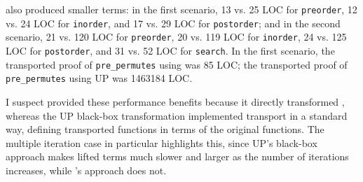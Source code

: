 \toolnamec also produced smaller terms:
in the first scenario, 13 vs. 25 LOC for \lstinline{preorder},
12 vs. 24 LOC for \lstinline{inorder}, and 17 vs. 29 LOC for \lstinline{postorder};
and in the second scenario, 21 vs. 120 LOC for \lstinline{preorder}, 20 vs. 119 LOC for \lstinline{inorder}, 
24 vs. 125 LOC for \lstinline{postorder}, and 31 vs. 52 LOC for \lstinline{search}.
In the first scenario, the transported proof of \lstinline{pre_permutes} using \toolnamec was 85 LOC;
the transported proof of \lstinline{pre_permutes} using UP was 1463184 LOC.

I suspect \toolnamec provided these performance benefits because it directly
transformed , whereas the UP black-box transformation implemented transport in a standard way,
defining transported functions in terms of the original functions. 
The multiple iteration case in particular highlights this,
since UP's black-box approach makes lifted terms much slower and larger as the number of iterations increases,
while \toolnamec's approach does not.


